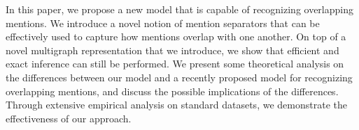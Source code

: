 In this paper, we propose a new model that is capable of recognizing overlapping mentions. We introduce a novel notion of mention separators that can be effectively used to capture how mentions overlap with one another. On top of a novel multigraph representation that we introduce, we show that efficient and exact inference can still be performed. We present some theoretical analysis on the differences between our model and a recently proposed model for recognizing overlapping mentions, and discuss the possible implications of the differences. Through extensive empirical analysis on standard datasets, we demonstrate the effectiveness of our approach.
